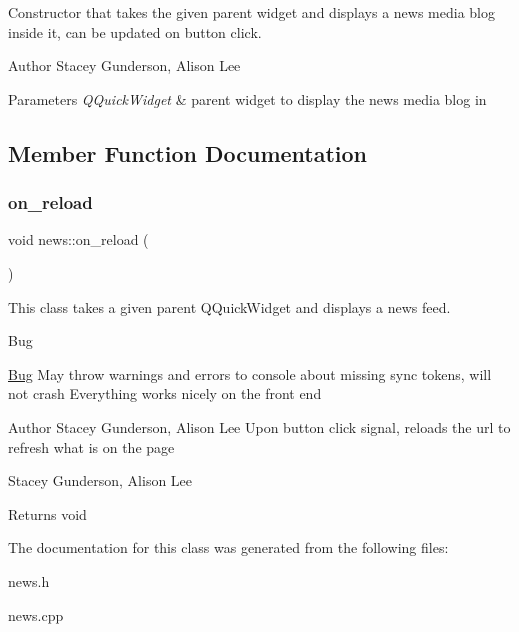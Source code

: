 Constructor that takes the given parent widget and displays a news media blog inside it, can be updated on button click. 

\begin{DoxyAuthor}{Author}
Stacey Gunderson, Alison Lee 
\end{DoxyAuthor}

\begin{DoxyParams}{Parameters}
{\em Q\+Quick\+Widget} & parent widget to display the news media blog in \\
\hline
\end{DoxyParams}


\subsection{Member Function Documentation}
\mbox{\label{classnews_a048f06e78e76602e4a8d2eb560bf9a23}} 
\subsubsection{\texorpdfstring{on\+\_\+reload}{on\_reload}}
{\footnotesize\ttfamily void news\+::on\+\_\+reload (\begin{DoxyParamCaption}{ }\end{DoxyParamCaption})\hspace{0.3cm}{\ttfamily [slot]}}



This class takes a given parent Q\+Quick\+Widget and displays a news feed. 

\begin{DoxyRefDesc}{Bug}
\item[\mbox{\hyperlink{bug__bug000001}{Bug}}]May throw warnings and errors to console about missing sync tokens, will not crash Everything works nicely on the front end \end{DoxyRefDesc}
\begin{DoxyAuthor}{Author}
Stacey Gunderson, Alison Lee Upon button click signal, reloads the url to refresh what is on the page 

Stacey Gunderson, Alison Lee 
\end{DoxyAuthor}
\begin{DoxyReturn}{Returns}
void 
\end{DoxyReturn}


The documentation for this class was generated from the following files\+:\begin{DoxyCompactItemize}
\item 
news.\+h\item 
news.\+cpp\end{DoxyCompactItemize}

